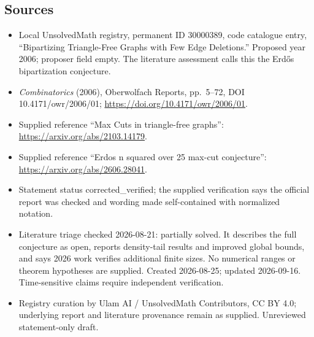 \documentclass[11pt]{article}
\begin{document}
\subsection{Sources}
\begin{itemize}
\item Local UnsolvedMath registry, permanent ID 30000389, code catalogue entry, ``Bipartizing Triangle-Free Graphs with Few Edge Deletions.'' Proposed year 2006; proposer field empty. The literature assessment calls this the Erd\H{o}s bipartization conjecture.
\item \emph{Combinatorics} (2006), Oberwolfach Reports, pp.\ 5--72, DOI 10.4171/owr/2006/01; \url{https://doi.org/10.4171/owr/2006/01}.
\item Supplied reference ``Max Cuts in triangle-free graphs'': \url{https://arxiv.org/abs/2103.14179}.
\item Supplied reference ``Erdos n squared over 25 max-cut conjecture'': \url{https://arxiv.org/abs/2606.28041}.
\item Statement status corrected\_verified; the supplied verification says the official report was checked and wording made self-contained with normalized notation.
\item Literature triage checked 2026-08-21: partially solved. It describes the full conjecture as open, reports density-tail results and improved global bounds, and says 2026 work verifies additional finite sizes. No numerical ranges or theorem hypotheses are supplied. Created 2026-08-25; updated 2026-09-16. Time-sensitive claims require independent verification.
\item Registry curation by Ulam AI / UnsolvedMath Contributors, CC BY 4.0; underlying report and literature provenance remain as supplied. Unreviewed statement-only draft.
\end{itemize}
\end{document}
